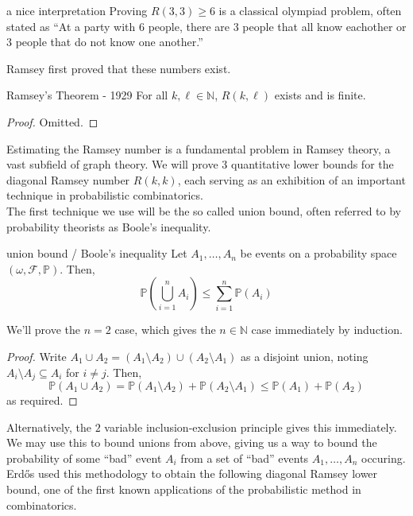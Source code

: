 \documentclass{article}
\begin{document}
\begin{remark}[]{a nice interpretation}
    Proving $R(3,3) \geq 6$ is a classical olympiad problem, often stated as ``At a party with 
    $6$ people, there are $3$ people that all know eachother or $3$ people that do not know one another.'' 
\end{remark}

Ramsey first proved that these numbers exist. 

\begin{theorem}[]{Ramsey's Theorem - 1929}
    For all $k, \ell \in \mathbb{N}$, $R(k, \ell)$ exists and is finite. 
\end{theorem}

\begin{proof}
    Omitted. 
\end{proof}

Estimating the Ramsey number is a fundamental problem in Ramsey theory, a vast subfield of graph theory. We 
will prove 3 quantitative lower bounds for the diagonal Ramsey number $R(k, k)$, each serving as an exhibition 
of an important technique in probabilistic combinatorics. \\ 

The first technique we use will be the so called union bound, often referred to by probability theorists as 
Boole's inequality. 

\begin{lemma}[]{union bound / Boole's inequality}
    Let $A_1, \dots, A_n$ be events on a probability space $(\omega, \mathcal{F}, \mathbb{P})$. Then, 
    \[\mathbb{P}\left(\bigcup_{i = 1}^n A_i\right) \leq \sum_{i = 1}^n \mathbb{P}(A_i)\]
\end{lemma}

We'll prove the $n=2$ case, which gives the $n \in \mathbb{N}$ case immediately by induction. 

\begin{proof}
    Write $A_1 \cup A_2 = (A_1 \setminus A_2) \cup (A_2 \setminus A_1)$ as a disjoint union, noting $A_i \setminus A_j 
    \subseteq A_i$ for $i \neq j$. Then,
    \[\mathbb{P}(A_1 \cup A_2) = \mathbb{P}(A_1 \setminus A_2) + \mathbb{P}(A_2 \setminus A_1) 
    \leq \mathbb{P}(A_1) + \mathbb{P}(A_2)\] as required.
\end{proof}

Alternatively, the $2$ variable inclusion-exclusion principle gives this immediately. \\ 

We may use this to bound unions from above, giving us a way to bound the probability of some ``bad'' event 
$A_i$ from a set of ``bad'' events $A_1, \dots, A_n$ occuring. Erd\H{o}s used this methodology to obtain the 
following diagonal Ramsey lower bound, one of the first known applications of the probabilistic method in combinatorics. 
\end{document}
